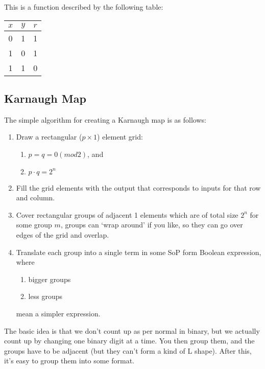 \documentclass[11pt,a4paper,titlepage,dvipsnames,cmyk]{scrartcl}
\begin{document}
This is a function described by the following table:
\begin{center}
    \begin{tabular}{|c c|c|}
        \hline
        $x$ & $y$ & $r$ \\
        \hline
        0 & 1 & 1 \\
        \hline
        1 & 0 & 1 \\
        \hline
        1 & 1 & 0 \\
        \hline
    \end{tabular}
\end{center}

\subsection{Karnaugh Map}%
\label{sub:karnaugh}

The simple algorithm for creating a Karnaugh map is as follows:
\begin{enumerate}
    \item Draw a rectangular ($p \times 1$) element grid:
    \begin{enumerate}
        \item $p = q = 0 (mod 2)$, and
        \item $p \cdot q = 2^n$
    \end{enumerate}
    \item Fill the grid elements with the output that corresponds to
        inputs for that row and column.
    \item Cover rectangular groups of
        adjacent 1 elements which are of total size $2^n$ for some group
        $m$, groups can `wrap around' if you like, so they can go over
        edges of the grid and overlap.
    \item Translate each group into a single term in some SoP form Boolean
        expression, where
    \begin{enumerate}
        \item bigger groups
        \item less groups
    \end{enumerate}
    mean a simpler expression.
\end{enumerate}

The basic idea is that we don't count up as per normal in binary, but we
actually count up by changing one binary digit at a time. You then group
them, and the groups have to be adjacent (but they can't form a kind of L
shape). After this, it's easy to group them into some format.
\end{document}
